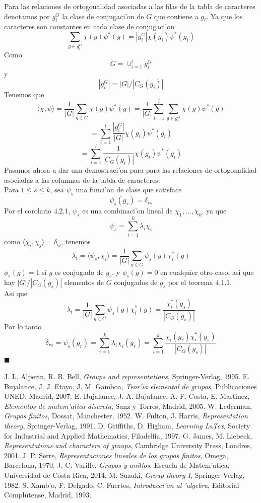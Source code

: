 \documentclass[a4paper,openright,12pt]{book}
\numberwithin{equation}{section} %
\newenvironment{proof}{\noindent{\it Demostracion:}}{\hfill$\blacksquare$} %
\begin{document}
\begin{proof}
Para las relaciones de ortogonalidad asociadas a las filas de la tabla de caracteres denotamos por $g_{i}^{G}$ la clase de conjugaci'on de $G$ que contiene a $g_{i}$. Ya que los caracteres son constantes en cada clase de conjugaci'on
\[
\sum_{g \in g_{i}^{G}}\chi(g)\psi^{*}(g)=|g_{i}^{G}|\chi(g_{i})\psi^{*}(g_{i})
\]
Como
\[
G=\cup_{i=1}^{l} g_{i}^{G}
\]
y
\[
|g_{i}^{G}|=|G|/|C_{G}(g_{i})|
\]
Tenemos que
\[
\langle \chi, \psi \rangle = \frac{1}{|G|} \sum_{g \in G}\chi(g)\psi^{*}(g)=\frac{1}{|G|} \sum_{i=1}^{l} \sum_{g \in g_{i}^{G}} \chi(g)\psi^{*}(g)
\]
\[
=\sum_{i=1}^{l}\frac{|g_{i}^{G}|}{|G|}\chi (g_{i})\psi^{*}(g_{i})
\]
\[
=\sum_{i=1}^{l}\frac{1}{|C_{G}(g_{i})|}\chi(g_{i})\psi^{*}(g_{i})
\]
Pasamos ahora a dar una demostraci'on para para las relaciones de ortogonalidad asociadas a las columnas de la tabla de caracteres:\\
Para $1 \leq s \leq k$, sea $\psi_{s}$ una funci'on de clase que satisface 
\[
\psi_{s}(g_{r})=\delta_{rs}
\]
Por el corolario 4.2.1, $\psi_{s}$ es una combinaci'on lineal de $\chi_{1}, \ldots ,\chi_{k}$, ya que
\[
\psi_{s}=\sum_{i=1}^{k}\lambda_{i}\chi_{i}
\]
como $\langle \chi_{i} ,\chi_{j} \rangle = \delta_{ij}$, tenemos
\[
\lambda_{i}=\langle \psi_{s}, \chi_{i} \rangle = \frac{1}{|G|}\sum_{g \in G}\psi_{s}(g)\chi_{i}^{*}(g)
\]
$\phi_{s}(g)=1$ si $g$ es conjugado de $g_{s}$, y $\phi_{s}(g)=0$ en cualquier otro caso; asi que hay $|G|/|C_{G}(g_{s})|$ elementos de $G$ conjugados de $g_{s}$ por el teorema 4.1.1.\\
Asi que
\[
\lambda_{i}=\frac{1}{|G|}\sum_{g \in G}\psi_{s}(g)\chi_{i}^{*}(g)=\frac{\chi_{i}^{*}(g_{s})}{|C_{G}(g_{s})|}
\]
Por lo tanto
\[
\delta_{rs}=\psi_{s}(g_{r})=\sum_{i=1}^{k}\lambda_{i}\chi_{i}(g_{r})=\sum_{i=1}^{k}\frac{\chi_{i}(g_{r})\chi_{i}^{*}(g_{s})}{|C_{G}(g_{s})|}
\]
\end{proof}
\newpage
$\ $
\thispagestyle{empty}
\begin{thebibliography}{9}
 J. L. Alperin, R. B. Bell, \emph{Groups and representations}, Springer-Verlag, 1995.
 E. Bujalance, J. J. Etayo, J. M. Gamboa, \emph{Teor'ia elemental de grupos}, Publicaciones UNED, Madrid, 2007.
 E. Bujalance, J. A. Bujalance, A. F. Costa, E. Martinez, \emph{Elementos de matem'atica discreta}, Sanz y Torres, Madrid, 2005.
 W. Lederman, \emph{Grupos finitos}, Dossat, Manchester, 1952.
 W. Fulton, J. Harris, \emph{Representation theory}, Springer-Verlag, 1991.
 D. Griffiths, D. Higham, \emph{Learning LaTex}, Society for Industrial and Applied Mathematics, Filadelfia, 1997.
 G. James, M. Liebeck, \emph{Representations and characters of groups}, Cambridge University Press, Londres, 2001.
 J. P. Serre, \emph{Representaciones lineales de los grupos finitos}, Omega, Barcelona, 1970.
 J. C. Varilly, \emph{Grupos y anillos}, Escuela de Matem'atica, Universidad de Costa Rica, 2014. 
 M. Suzuki, \emph{Group theory I}, Springer-Verlag, 1982. 
 S. Xamb'o, F. Delgado, C. Fuertes, \emph{Introducci'on al 'algebra}, Editorial Complutense, Madrid, 1993.
\end{thebibliography}
\end{document}
